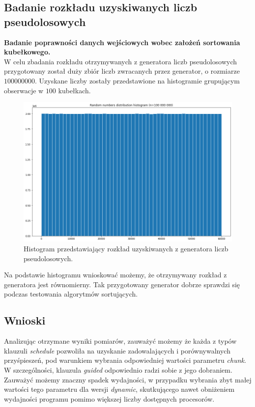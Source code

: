\documentclass{article}
\begin{document}
        \subsection{Badanie rozkładu uzyskiwanych liczb pseudolosowych}
        \textbf{Badanie poprawności danych wejściowych wobec założeń sortowania kubełkowego.}\\
        W celu zbadania rozkładu otrzymywanych z generatora liczb pseudolosowych przygotowany został duży zbiór liczb zwracanych przez generator, o rozmiarze $100 000 000$. Uzyskane liczby zostały przedstawione na histogramie grupującym obserwacje w $100$ kubełkach.
        \begin{figure}[h!]
            \centering
            \includegraphics[width=17cm]{report2/images/RandomGen/random_dist_histo_100000000.png}
            \caption{Histogram przedstawiający rozkład uzyskiwanych z generatora liczb pseudolosowych. }
        \end{figure}
        
        Na podstawie histogramu wnioskować możemy, że otrzymywany rozkład z generatora jest równomierny. Tak przygotowany generator dobrze sprawdzi się podczas testowania algorytmów sortujących.

        \subsection{Wnioski}
        Analizując otrzymane wyniki pomiarów, zauważyć możemy że każda z typów klauzuli \textit{schedule} pozwoliła na uzyskanie zadowalających i porównywalnych przyśpieszeń, pod warunkiem wybrania odpowiedniej wartości parametru \textit{chunk}. W szczególności, klauzula \textit{guided} odpowiednio radzi sobie z jego dobraniem. Zauważyć możemy znaczny spadek wydajności, w przypadku wybrania zbyt małej wartości tego parametru dla wersji \textit{dynamic}, skutkującego nawet obniżeniem wydajności programu pomimo większej liczby dostępnych procesorów. 
        
\end{document}
